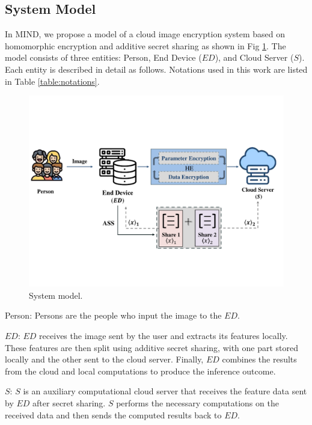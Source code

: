 \documentclass[conference]{IEEEtran}
\begin{document}
\subsection{System Model}
 In MIND, we propose a model of a cloud image encryption system based on homomorphic encryption and additive secret sharing as shown in Fig \ref{fig:system_model}. The model consists of three entities: Person, End Device ($ED$), and Cloud Server ($S$). Each entity is described in detail as follows. Notations used in this work are listed in Table \ref{table:notations}.
\begin{figure}[ht]
\includegraphics[width=1\linewidth]{fig1.pdf}
\caption{System model.} \label{fig:system_model}
\end{figure}

Person: Persons are the people who input the image to the $ED$. 

$ED$: $ED$ receives the image sent by the user and extracts its features locally. These features are then split using additive secret sharing, with one part stored locally and the other sent to the cloud server. Finally, $ED$ combines the results from the cloud and local computations to produce the inference outcome.

$S$: $S$ is an auxiliary computational cloud server that receives the feature data sent by $ED$ after secret sharing. $S$ performs the necessary computations on the received data and then sends the computed results back to $ED$. 
 
\end{document}
